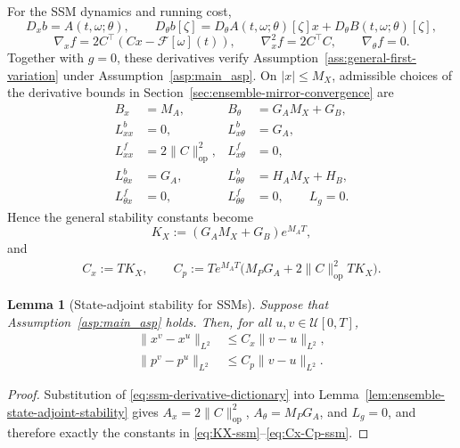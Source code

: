 \documentclass[11pt]{amsart}
\numberwithin{equation}{section} %
\newtheorem{lemma}{Lemma}[section]
\theoremstyle{remark}
\begin{document}
For the SSM dynamics and running cost,
\[
D_x b=A(t,\omega;\theta),
\qquad
D_\theta b[\zeta]
=D_\theta A(t,\omega;\theta)[\zeta]x
+D_\theta B(t,\omega;\theta)[\zeta],
\]
\[
\nabla_x f=2C^\top(Cx-\mathcal F[\omega](t)),
\qquad \nabla_x^2f=2C^\top C,
\qquad \nabla_\theta f=0.
\]
Together with $g=0$, these derivatives verify
Assumption~\ref{ass:general-first-variation} under
Assumption~\ref{asp:main_asp}.  On $|x|\le M_X$, admissible choices
of the derivative bounds in Section~\ref{sec:ensemble-mirror-convergence}
are
\begin{equation}
\label{eq:ssm-derivative-dictionary}
\begin{aligned}
B_x&=M_A,& B_\theta&=G_AM_X+G_B,\\
L_{xx}^b&=0,& L_{x\theta}^b&=G_A,\\
L_{xx}^f&=2\|C\|_{\mathrm{op}}^2,& L_{x\theta}^f&=0,\\
L_{\theta x}^b&=G_A,& L_{\theta\theta}^b&=H_AM_X+H_B,\\
L_{\theta x}^f&=0,& L_{\theta\theta}^f&=0,\qquad L_g=0.
\end{aligned}
\end{equation}
Hence the general stability constants become
\begin{equation}
\label{eq:KX-ssm}
K_X:=(G_AM_X+G_B)e^{M_AT},
\end{equation}
and
\begin{align}
\label{eq:Cx-Cp-ssm}
C_x:=TK_X, \qquad
C_p:=Te^{M_AT}\bigl(M_PG_A+2\|C\|_{\mathrm{op}}^2TK_X\bigr).
\end{align}

\begin{lemma}[State-adjoint stability for SSMs]
\label{lem:ssm-state-adjoint-stability}
Suppose that Assumption~\ref{asp:main_asp} holds.  Then, for all
$u,v\in\mathcal U[0,T]$,
\begin{align}
\label{eq:ssm-state-stability}
\|x^v-x^u\|_{L^2}&\le C_x\|v-u\|_{L^2},\\
\label{eq:ssm-adjoint-stability}
\|p^v-p^u\|_{L^2}&\le C_p\|v-u\|_{L^2}.
\end{align}
\end{lemma}

\begin{proof}
Substitution of \eqref{eq:ssm-derivative-dictionary} into
Lemma~\ref{lem:ensemble-state-adjoint-stability} gives
$A_x=2\|C\|_{\mathrm{op}}^2$, $A_\theta=M_PG_A$, and $L_g=0$, and therefore
exactly the constants in \eqref{eq:KX-ssm}--\eqref{eq:Cx-Cp-ssm}.
\end{proof}
\end{document}
